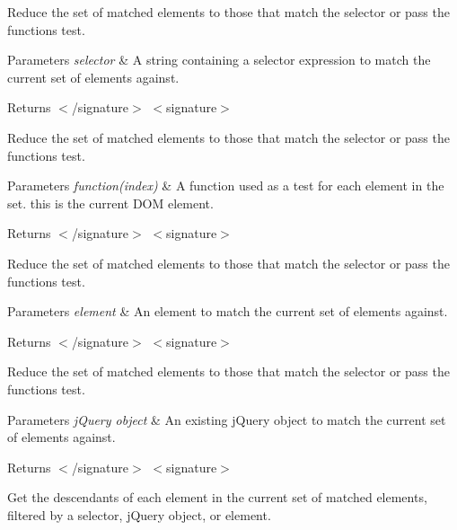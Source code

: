 Reduce the set of matched elements to those that match the selector or pass the function\textquotesingle{}s test.


\begin{DoxyParams}{Parameters}
{\em selector} & A string containing a selector expression to match the current set of elements against.\\
\hline
\end{DoxyParams}
\begin{DoxyReturn}{Returns}
$<$/signature$>$ $<$signature$>$ 

Reduce the set of matched elements to those that match the selector or pass the function\textquotesingle{}s test.
\end{DoxyReturn}

\begin{DoxyParams}{Parameters}
{\em function(index)} & A function used as a test for each element in the set. this is the current D\+OM element.\\
\hline
\end{DoxyParams}
\begin{DoxyReturn}{Returns}
$<$/signature$>$ $<$signature$>$ 

Reduce the set of matched elements to those that match the selector or pass the function\textquotesingle{}s test.
\end{DoxyReturn}

\begin{DoxyParams}{Parameters}
{\em element} & An element to match the current set of elements against.\\
\hline
\end{DoxyParams}
\begin{DoxyReturn}{Returns}
$<$/signature$>$ $<$signature$>$ 

Reduce the set of matched elements to those that match the selector or pass the function\textquotesingle{}s test.
\end{DoxyReturn}

\begin{DoxyParams}{Parameters}
{\em j\+Query object} & An existing j\+Query object to match the current set of elements against.\\
\hline
\end{DoxyParams}
\begin{DoxyReturn}{Returns}
$<$/signature$>$ $<$signature$>$ 

Get the descendants of each element in the current set of matched elements, filtered by a selector, j\+Query object, or element.
\end{DoxyReturn}

